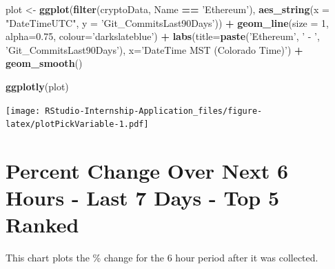 \documentclass[
]{book}
\newenvironment{Shaded}{\begin{snugshade}}{\end{snugshade}}
\newcommand{\DataTypeTok}[1]{\textcolor[rgb]{0.13,0.29,0.53}{#1}}
\newcommand{\DecValTok}[1]{\textcolor[rgb]{0.00,0.00,0.81}{#1}}
\newcommand{\FloatTok}[1]{\textcolor[rgb]{0.00,0.00,0.81}{#1}}
\newcommand{\KeywordTok}[1]{\textcolor[rgb]{0.13,0.29,0.53}{\textbf{#1}}}
\newcommand{\NormalTok}[1]{#1}
\newcommand{\OperatorTok}[1]{\textcolor[rgb]{0.81,0.36,0.00}{\textbf{#1}}}
\newcommand{\StringTok}[1]{\textcolor[rgb]{0.31,0.60,0.02}{#1}}
\begin{document}
\begin{Shaded}
\begin{Highlighting}[]
\NormalTok{plot <-}\StringTok{ }\KeywordTok{ggplot}\NormalTok{(}\KeywordTok{filter}\NormalTok{(cryptoData, Name }\OperatorTok{==}\StringTok{ 'Ethereum'}\NormalTok{), }\KeywordTok{aes_string}\NormalTok{(}\DataTypeTok{x =} \StringTok{"DateTimeUTC"}\NormalTok{, }\DataTypeTok{y =} \StringTok{'Git_CommitsLast90Days'}\NormalTok{)) }\OperatorTok{+}
\StringTok{  }
\StringTok{  }\KeywordTok{geom_line}\NormalTok{(}\DataTypeTok{size =} \DecValTok{1}\NormalTok{, }\DataTypeTok{alpha=}\FloatTok{0.75}\NormalTok{, }\DataTypeTok{colour=}\StringTok{'darkslateblue'}\NormalTok{) }\OperatorTok{+}
\StringTok{  }
\StringTok{  }\KeywordTok{labs}\NormalTok{(}\DataTypeTok{title=}\KeywordTok{paste}\NormalTok{(}\StringTok{'Ethereum'}\NormalTok{, }\StringTok{' - '}\NormalTok{, }\StringTok{'Git_CommitsLast90Days'}\NormalTok{),}
       \DataTypeTok{x=}\StringTok{'DateTime MST (Colorado Time)'}\NormalTok{) }\OperatorTok{+}
\StringTok{  }
\StringTok{  }\KeywordTok{geom_smooth}\NormalTok{()}

\KeywordTok{ggplotly}\NormalTok{(plot)}
\end{Highlighting}
\end{Shaded}

\texttt{[image: RStudio-Internship-Application\_files/figure-latex/plotPickVariable-1.pdf]}

\hypertarget{percent-change-over-next-6-hours---last-7-days---top-5-ranked}{%
\section{Percent Change Over Next 6 Hours - Last 7 Days - Top 5 Ranked}\label{percent-change-over-next-6-hours---last-7-days---top-5-ranked}}

This chart plots the \% change for the 6 hour period after it was collected.

\begin{Shaded}
\end{Shaded}
\end{document}
